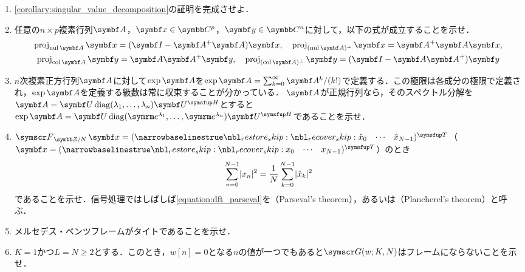 \documentclass[../../main]{subfiles}
\begin{document}
\begin{enumerate}
  \item \cref{corollary:singular_value_decomposition}の証明を完成させよ．
  \item 任意の\(n\times p\)複素行列\(\mat{A}\)，\(\vect{x}\in\numset{C}^p\)，\(\vect{y}\in\numset{C}^n\)に対して，以下の式が成立することを示せ．
    \begin{gather*}
      \proj_{\nulsp\mat{A}}\vect{x} = (\imat-\pinv{\mat{A}}\mat{A})\vect{x},
      \quad\proj_{\pcomp{(\nulsp\mat{A})}}\vect{x} = \pinv{\mat{A}}\mat{A}\vect{x}, \\
      \proj_{\colsp\mat{A}}\vect{y} = \mat{A}\pinv{\mat{A}}\vect{y},
      \quad\proj_{\pcomp{(\colsp\mat{A})}}\vect{y} = (\imat-\mat{A}\pinv{\mat{A}})\vect{y}
    \end{gather*}
  \item \(n\)次複素正方行列\(\mat{A}\)に対して\(\exp\mat{A}\)を\(\exp\mat{A}=\sum_{k=0}^\infty\mat{A}^k/(k!)\)で定義する．この極限は各成分の極限で定義され，\(\exp\mat{A}\)を定義する級数は常に収束することが分かっている．
    \(\mat{A}\)が正規行列なら，そのスペクトル分解を\(\mat{A}=\mat{U}\diag(\lambda_1,\dots,\lambda_n)\htrps{\mat{U}}\)とすると\(\exp\mat{A}=\mat{U}\diag(\napr^{\lambda_1},\dots,\napr^{\lambda_n})\htrps{\mat{U}}\)であることを示せ．
  \item \(\dft{N}\vect{x}=\trps{\rowvect{\hat{x}_0 & \cdots & \hat{x}_{N-1}}}\)（\(\vect{x}=\trps{\rowvect{x_0 & \cdots & x_{N-1}}}\)）のとき
    \begin{equation}
      \label{equation:dft_parseval}
      \sum_{n=0}^{N-1}\lvert x_n\rvert^2 = \frac{1}{N}\sum_{k=0}^{N-1}\lvert\hat{x}_k\rvert^2
    \end{equation}
    であることを示せ．信号処理ではしばしば\cref{equation:dft_parseval}を（Parseval's theorem），あるいは（Plancherel's theorem）と呼ぶ．  
  \item メルセデス・ベンツフレームがタイトであることを示せ．
  \item \(K=1\)かつ\(L=N\geq 2\)とする．このとき，\(w[n]=0\)となる\(n\)の値が一つでもあると\(\gaborsys{w}{K}{N}\)はフレームにならないことを示せ．
\end{enumerate}
\end{document}
